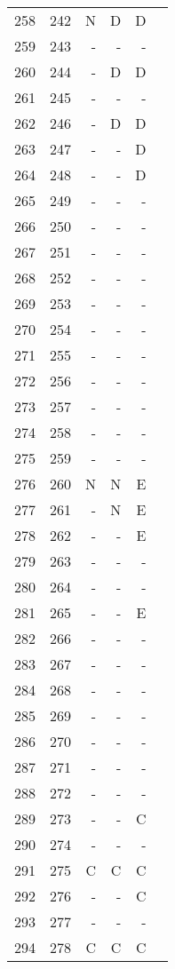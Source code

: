 \begin{longtable}{rrrrrr}
  258 & 242 & N & D & D &  \\ 
  259 & 243 & - & - & - &  \\ 
  260 & 244 & - & D & D &  \\ 
  261 & 245 & - & - & - &  \\ 
  262 & 246 & - & D & D &  \\ 
  263 & 247 & - & - & D &  \\ 
  264 & 248 & - & - & D &  \\ 
  265 & 249 & - & - & - &  \\ 
  266 & 250 & - & - & - &  \\ 
  267 & 251 & - & - & - &  \\ 
  268 & 252 & - & - & - &  \\ 
  269 & 253 & - & - & - &  \\ 
  270 & 254 & - & - & - &  \\ 
  271 & 255 & - & - & - &  \\ 
  272 & 256 & - & - & - &  \\ 
  273 & 257 & - & - & - &  \\ 
  274 & 258 & - & - & - &  \\ 
  275 & 259 & - & - & - &  \\ 
  276 & 260 & N & N & E &  \\ 
  277 & 261 & - & N & E &  \\ 
  278 & 262 & - & - & E &  \\ 
  279 & 263 & - & - & - &  \\ 
  280 & 264 & - & - & - &  \\ 
  281 & 265 & - & - & E &  \\ 
  282 & 266 & - & - & - &  \\ 
  283 & 267 & - & - & - &  \\ 
  284 & 268 & - & - & - &  \\ 
  285 & 269 & - & - & - &  \\ 
  286 & 270 & - & - & - &  \\ 
  287 & 271 & - & - & - &  \\ 
  288 & 272 & - & - & - &  \\ 
  289 & 273 & - & - & C &  \\ 
  290 & 274 & - & - & - &  \\ 
  291 & 275 & C & C & C &  \\ 
  292 & 276 & - & - & C &  \\ 
  293 & 277 & - & - & - &  \\ 
  294 & 278 & C & C & C &  \\ 

\end{longtable}
